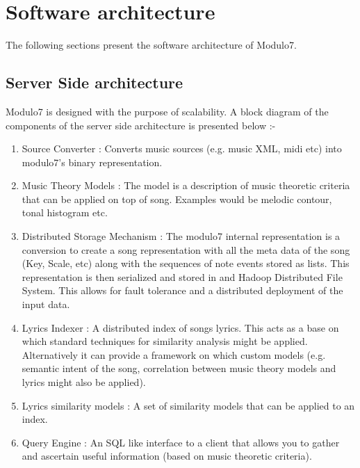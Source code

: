 \chapter{Software architecture}
The following sections present the software architecture of Modulo7.
\section{Server Side architecture}
\noindent Modulo7 is designed with the purpose of scalability. A block diagram of the components of the server side architecture is presented below :-
\begin{enumerate}
\item Source Converter : Converts music sources (e.g. music XML, midi etc) into modulo7's binary representation.
\item Music Theory Models : The model is a description of music theoretic criteria that can be applied on top of song. Examples would be melodic contour, tonal histogram etc. 
\item Distributed Storage Mechanism : The modulo7 internal representation is a conversion to create a song representation with all the meta data of the song (Key, Scale,  etc) along with the sequences of note events stored as lists. This representation is then serialized and stored in and Hadoop Distributed File System. This allows for fault tolerance and a distributed deployment of the input data.
\item Lyrics Indexer : A distributed index of songs lyrics. This acts as a base on which standard techniques for similarity analysis might be applied. Alternatively it can provide a framework on which custom models (e.g. semantic intent of the song, correlation between music theory models and lyrics might also be applied).  
\item Lyrics similarity models : A set of similarity models that can be applied to an index. 
\item Query Engine : An SQL like interface to a client that allows you to gather and ascertain useful information (based on music theoretic criteria). 
\end{enumerate}

